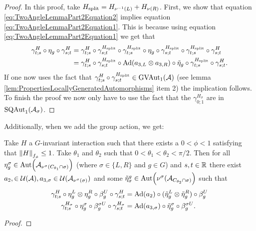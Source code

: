 \documentclass[11pt,a4paper,twoside]{article}
\numberwithin{equation}{section}
\begin{document}
{\begin{lemma}
\begin{align}
		\end{align}
	\end{lemma}
	\begin{proof}
		In this proof, take $\Hsplit=H_{\nu^{-1}(L)}+H_{\nu(R)}$. First, we show that equation \eqref{eq:TwoAngleLemmaPart2Equation2} implies equation \eqref{eq:TwoAngleLemmaPart2Equation1}. This is because using equation \eqref{eq:TwoAngleLemmaPart2Equation1} we get that
		\begin{align}
			\gamma^H_{t;s}\circ\eta_g\circ\gamma^{H}_{s;t}&=\gamma^H_{t;s}\circ\gamma^{\Hsplit}_{s;t}\circ\gamma^{\Hsplit}_{t;s}\circ\eta_g\circ\gamma^{\Hsplit}_{s;t}\circ\gamma^{\Hsplit}_{t;s}\circ\gamma^H_{s;t}\\
			&=\gamma^H_{t;s}\circ\gamma^{\Hsplit}_{s;t}\circ\Ad{a_{3,L}\otimes a_{3,R}}\circ\tilde{\eta}_g\circ\gamma^{\Hsplit}_{t;s}\circ\gamma^H_{s;t}.
		\end{align}
		If one now uses the fact that $\gamma^H_{t;s}\circ\gamma^{\Hsplit}_{s;t}\in\textrm{GVAut}_1(\AA)$ (see lemma \ref{lem:PropertiesLocallyGeneratedAutomorphisms} item 2) the implication follows. To finish the proof we now only have to use the fact that the $\gamma^{H_\sigma}_{0;1}$ are in $\textrm{SQAut}_1(\AA_\sigma)$.
	\end{proof}
	Additionally, when we add the group action, we get:
	\begin{lemma}\label{lem:TwoAngleLemmaPart3}
		Take $H$ a $G$-invariant interaction such that there exists a $0<\phi<1$ satisfying that $\norm{H}_{f_\phi}\leq 1$. Take $\theta_1$ and $\theta_2$ such that $0<\theta_1<\theta_2<\pi/2$. Then for all $\eta_{g}^{\sigma}\in\Aut{\AA_{\nu^{\sigma}(C_{\theta_1}\cap\sigma)}}$ (where $\sigma\in\{L,R\}$ and $g\in G$) and $s,t\in\RR$ there exist $a_{2},\in\UU(\AA),a_{3,\sigma}\in\UU(\AA_{\nu^{\sigma}(\sigma)})$ and some $\tilde{\eta}_{\sigma}^g\in \Aut{\nu^{\sigma}(\AA_{C_{\theta_2}\cap\sigma)}}$ such that
		\begin{align}
			\label{eq:TwoAngleLemmaPart3Equation1}
			\gamma^{H}_{t;s}\circ\eta_{g}^L\otimes\eta_{g}^R\circ\beta_g^U\circ\gamma^{H}_{s;t}&=\Ad{a_2}\circ(\tilde\eta_{g}^L \otimes\tilde\eta_{g}^R)\circ\beta_g^U\\
			\label{eq:TwoAngleLemmaPart3Equation2}
			\gamma^{H_\sigma}_{t;s}\circ\eta_g^\sigma\circ\beta_g^{\sigma U}\circ\gamma^{H_\sigma}_{s;t}&=\Ad{a_{3,\sigma}}\circ \tilde\eta_{g}^\sigma\circ\beta_g^{\sigma U}.
		\end{align}
	\end{lemma}
	\begin{proof}

\end{proof}}
\end{document}
